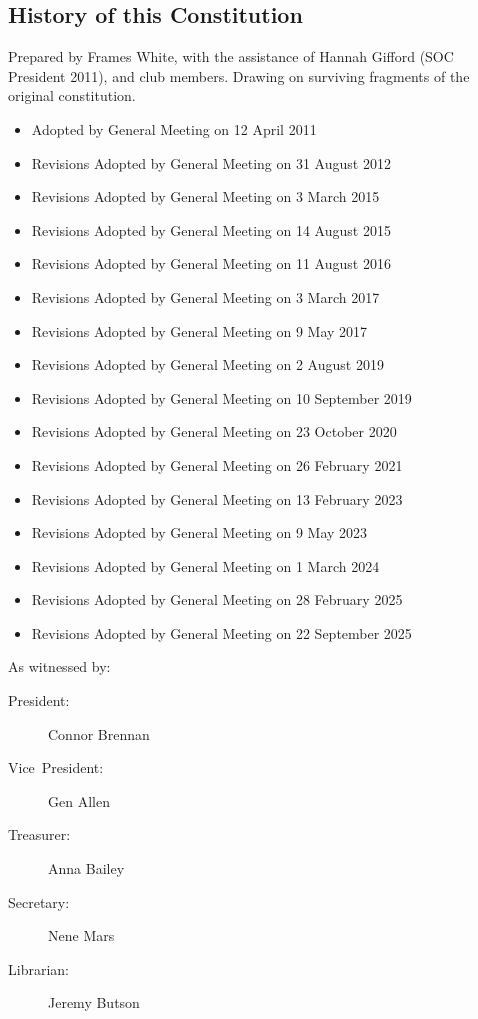 \documentclass[a4paper]{article}
\begin{document}
\begin{appendices}

    \section{History of this Constitution} \label{sec:app:history}

    \noindent Prepared by Frames White, with the assistance of Hannah Gifford (SOC President 2011), and club members. Drawing on surviving fragments of the original constitution.

    \medskip{}

    \begin{itemize}[label={}]
        \item Adopted by General Meeting on 12 April 2011
        \item Revisions Adopted by General Meeting on 31 August 2012
        \item Revisions Adopted by General Meeting on 3 March 2015
        \item Revisions Adopted by General Meeting on 14 August 2015
        \item Revisions Adopted by General Meeting on 11 August 2016
        \item Revisions Adopted by General Meeting on 3 March 2017
        \item Revisions Adopted by General Meeting on 9 May 2017
        \item Revisions Adopted by General Meeting on 2 August 2019
        \item Revisions Adopted by General Meeting on 10 September 2019
        \item Revisions Adopted by General Meeting on 23 October 2020
        \item Revisions Adopted by General Meeting on 26 February 2021
        \item Revisions Adopted by General Meeting on 13 February 2023
        \item Revisions Adopted by General Meeting on 9 May 2023
        \item Revisions Adopted by General Meeting on 1 March 2024
        \item Revisions Adopted by General Meeting on 28 February 2025
        \item Revisions Adopted by General Meeting on 22 September 2025
    \end{itemize}

    \medskip{}

    \noindent As witnessed by:
    \begin{description}
        \item[{President:}] Connor Brennan
        \item[{Vice~President:}] Gen Allen
        \item[{Treasurer:}] Anna Bailey
        \item[{Secretary:}] Nene Mars
        \item[{Librarian:}] Jeremy Butson
    \end{description}

\end{appendices}
\end{document}
